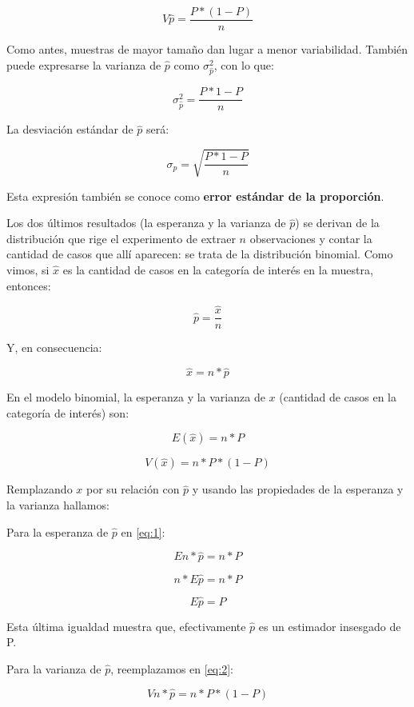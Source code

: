 \documentclass[]{book}
\begin{document}
\[V\widehat{p} = \frac{P*(1 - P)}{n}\]

Como antes, muestras de mayor tamaño dan lugar a menor variabilidad.
También puede expresarse la varianza de \(\widehat{p}\) como
\(\sigma_{\widehat{p}}^{2}\), con lo que:

\[\sigma_{\widehat{p}}^{2} = \frac{P*1 - P}{n}\]

La desviación estándar de \(\widehat{p}\) será:

\[\sigma_{\widehat{p}} = \sqrt{\frac{P*1 - P}{n}}\]

Esta expresión también se conoce como \textbf{error estándar de la proporción}.

Los dos últimos resultados (la esperanza y la varianza de \(\widehat{p}\)) se derivan de la distribución que rige el experimento de extraer \(n\) observaciones y contar la cantidad de casos que allí aparecen: se trata de la distribución binomial. Como vimos, si \(\widehat{x}\) es la cantidad de casos en la categoría de interés en la muestra, entonces:

\[\widehat{p} = \frac{\widehat{x}}{n}\]

Y, en consecuencia:

\[\widehat{x} = n*\widehat{p}\]

En el modelo binomial, la esperanza y la varianza de \(x\) (cantidad de
casos en la categoría de interés) son:

\begin{equation}
  \label{eq:1}
    E(\widehat{x}) = n*P
\end{equation}

\begin{equation}
  \label{eq:2}
    V(\widehat{x}) = n*P*(1 - P)
\end{equation}

Remplazando \(x\) por su relación con \(\widehat{p}\) y usando las propiedades de la esperanza y la varianza hallamos:

Para la esperanza de \(\widehat{p}\) en \eqref{eq:1}:

\[En*\widehat{p} = n*P\]

\[n*E\widehat{p} = n*P\]

\[E\widehat{p} = P\]

Esta última igualdad muestra que, efectivamente \(\widehat{p}\) es un
estimador insesgado de P.

Para la varianza de \(\widehat{p}\), reemplazamos en \eqref{eq:2}:

\[Vn*\widehat{p} = n*P*(1 - P)\]
\end{document}
